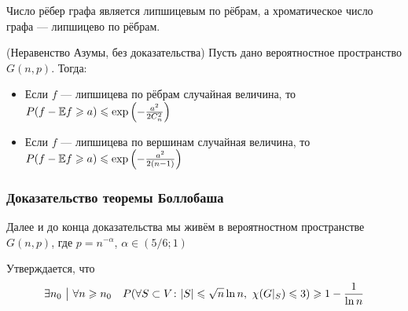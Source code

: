 \begin{note}
	Число рёбер графа является липшицевым по рёбрам, а хроматическое число графа --- липшицево по рёбрам.
\end{note}

\begin{theorem} (Неравенство Азумы, без доказательства)
	Пусть дано вероятностное пространство $G(n, p)$. Тогда:
	\begin{itemize}
		\item Если $f$ --- липшицева по рёбрам случайная величина, то \(P(f - \mathbb{E} f \geqslant a) \leqslant \exp\left(-\frac{a^2}{2C_n^2}\right)\)
		
		\item Если $f$ --- липшицева по вершинам случайная величина, то \(P(f - \mathbb{E} f \geqslant a) \leqslant \exp\left(-\frac{a^2}{2(n - 1)}\right)\)
	\end{itemize}
\end{theorem}

\subsubsection*{Доказательство теоремы Боллобаша}

\begin{note}
	Далее и до конца доказательства мы живём в вероятностном пространстве $G(n, p)$, где $p = n^{-\alpha}$, $\alpha \in (5/6; 1)$
\end{note}

\begin{lemma}
	Утверждается, что
	\[
		\exists n_0 \ \big|\  \forall n \geqslant n_0 \quad P(\forall S \subset V \colon |S| \leqslant \sqrt{n}\ln n,\ \chi(G|_S) \leqslant 3) \geqslant 1 - \frac{1}{\ln n}
	\]
\end{lemma}

